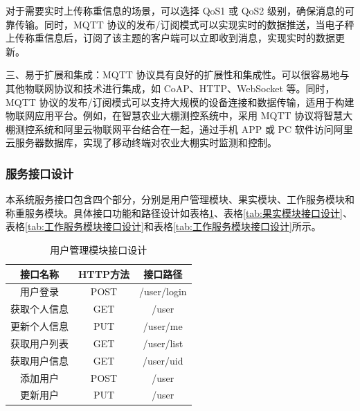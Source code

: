 \documentclass{xduugmr}
\begin{document}
对于需要实时上传称重信息的场景，可以选择 QoS1 或 QoS2 级别，确保消息的可靠传输。同时，MQTT 协议的发布/订阅模式可以实现实时的数据推送，当电子秤上传称重信息后，订阅了该主题的客户端可以立即收到消息，实现实时的数据更新。

三、易于扩展和集成：MQTT 协议具有良好的扩展性和集成性。可以很容易地与其他物联网协议和技术进行集成，如 CoAP、HTTP、WebSocket 等。同时，MQTT 协议的发布/订阅模式可以支持大规模的设备连接和数据传输，适用于构建物联网应用平台。例如，在智慧农业大棚测控系统中，采用 MQTT 协议将智慧大棚测控系统和阿里云物联网平台结合在一起，通过手机 APP 或 PC 软件访问阿里云服务器数据库，实现了移动终端对农业大棚实时监测和控制\cite{Liang2020}。

\subsubsection{服务接口设计}

本系统服务接口包含四个部分，分别是用户管理模块、果实模块、工作服务模块和称重服务模块。具体接口功能和路径设计如表格\ref{tab:用户管理模块接口设计}、表格\ref{tab:果实模块接口设计}、表格\ref{tab:工作服务模块接口设计}和表格\ref{tab:工作服务模块接口设计}所示。

\begin{table}[H]
\centering
\begin{tabular}{|c|c|c|}
\hline
\textbf{接口名称} & \textbf{HTTP方法} & \textbf{接口路径} \\
\hline
用户登录 & POST & /user/login \\
\hline
获取个人信息 & GET & /user \\
\hline
更新个人信息 & PUT & /user/me \\
\hline
获取用户列表 & GET & /user/list \\
\hline
获取用户信息 & GET & /user/{uid} \\
\hline
添加用户 & POST & /user \\
\hline
更新用户 & PUT & /user \\
\hline
\end{tabular}%

\caption{用户管理模块接口设计}
\label{tab:用户管理模块接口设计}
\end{table}
\end{document}
